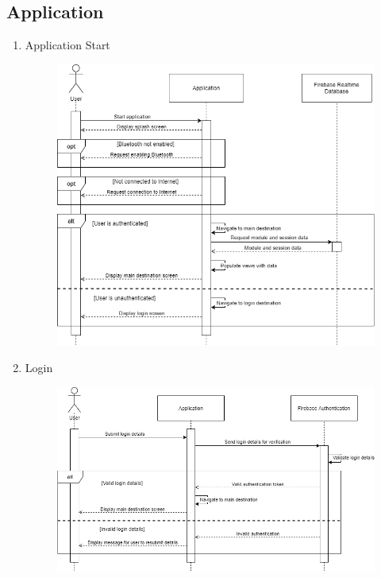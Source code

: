 \documentclass[../report.tex]{subfiles}
\begin{document}
\subsection{Application}
\begin{enumerate}
\item Application Start\\
\begin{figure}[H]
\centering
\includegraphics[width=\textwidth]{./images/05-07-app-start.png}
\label{fig:app-start-seq}
\end{figure}
\item Login\\
\begin{figure}[H]
\centering
\includegraphics[width=\textwidth]{./images/05-07-app-login.png}

\end{figure}
\end{enumerate}
\end{document}
